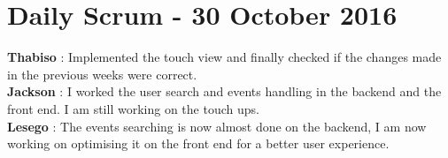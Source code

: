 \documentclass[10pt,a4paper]{article}
\begin{document}
\section{Daily Scrum - 30 October 2016}
\textbf{Thabiso} : Implemented the touch view and finally checked if the changes made in the previous weeks were correct.\\

\textbf{Jackson} : I worked the user search and events handling in the backend and the front end. I am  still working on the touch ups.\\

\textbf{Lesego} : The events searching is now almost done on the backend, I am now working on optimising it on the front end for a better 
user experience.\\
\end{document}
